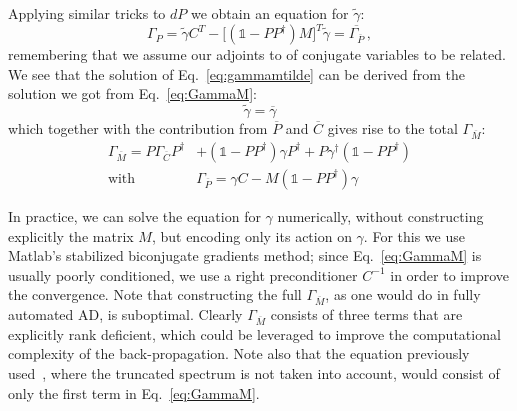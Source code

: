 \documentclass[twocolumn,floatfix,superscriptaddress,longbibliography,pra]{revtex4-2}
\begin{document}
Applying similar tricks to $dP$ we obtain an equation for $\tilde{\gamma}$:
\begin{equation}
    \Gamma_{P} = \tilde{\gamma}C^T - \big[(\mathbb{1} - PP^\dagger)M\big]^T\tilde{\gamma} = \overline{\Gamma_{\overline{P}}}\,,
    \label{eq:gammamtilde}
\end{equation}
remembering that we assume our adjoints to of conjugate variables to be related. We see that the solution of Eq.~\eqref{eq:gammamtilde} can be derived from the solution we got from Eq.~\eqref{eq:GammaM}:
\begin{equation}
    \tilde{\gamma}=\overline{\gamma}
\end{equation}
which together with the contribution from $\overline{P}$ and $\overline{C}$ gives rise to the total $\Gamma_{\overline{M}}$:
\begin{equation}
\begin{split}
     \Gamma_{\overline{M}} = P\Gamma_{\overline{C}}P^\dagger& + (\mathbb{1}-PP^\dagger)\gamma P^\dagger + P \gamma^\dagger (\mathbb{1}-PP^\dagger) \\
     \text{with}\qquad & \Gamma_{\overline{P}} = \gamma C - M(\mathbb{1} - PP^\dagger) \gamma
     \label{eq:gammaMfinal}
\end{split}
\end{equation}


In practice, we can solve the equation for $\gamma$ numerically, without constructing explicitly the matrix $M$, but encoding only its action on $\gamma$. For this we use Matlab's stabilized biconjugate gradients method; since Eq.~\eqref{eq:GammaM} is usually poorly conditioned, 
we use a right preconditioner $C^{-1}$ in order to improve the convergence. Note that constructing the full $\Gamma_{\overline{M}}$, as one would do in fully automated AD, is suboptimal. Clearly $\Gamma_{\overline{M}}$ consists of three terms that are explicitly rank deficient, which could be leveraged to improve the computational complexity of the back-propagation. Note also that the equation previously used~\cite{AD_CTM,Juraj_1AD}, where the truncated spectrum is not taken into account, would consist of only the first term in Eq.~\eqref{eq:GammaM}. 
\end{document}
